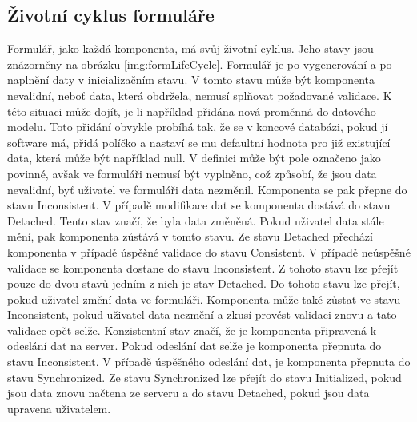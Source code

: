 \subsection{Životní cyklus formuláře}
Formulář, jako každá komponenta, má svůj životní cyklus. Jeho stavy jsou znázorněny na obrázku \ref{img:formLifeCycle}. Formulář je po vygenerování a po naplnění daty v inicializačním stavu. V tomto stavu může být komponenta nevalidní, neboť data, která obdržela, nemusí splňovat požadované validace. K této situaci může dojít, je-li například přidána nová proměnná do datového modelu. Toto přidání obvykle probíhá tak, že se v koncové databázi, pokud jí software má, přidá políčko a nastaví se mu defaultní hodnota pro již existující data, která může být například null. V definici může být pole označeno jako povinné, avšak ve formuláři nemusí být vyplněno, což způsobí, že jsou data nevalidní, byť uživatel ve formuláři data nezměnil. Komponenta se pak přepne do stavu Inconsistent. V případě modifikace dat se komponenta dostává do stavu Detached. Tento stav značí, že byla data změněná. Pokud uživatel data stále mění, pak komponenta zůstává v tomto stavu. Ze stavu Detached přechází komponenta v případě úspěšné validace do stavu Consistent. V případě neúspěšné validace se komponenta dostane do stavu Inconsistent. Z tohoto stavu lze přejít pouze do dvou stavů jedním z nich je stav Detached. Do tohoto stavu lze přejít, pokud uživatel změní data ve formuláři. Komponenta může také zůstat ve stavu Inconsistent, pokud uživatel data nezmění a zkusí provést validaci znovu a tato validace opět selže. Konzistentní stav značí, že je komponenta připravená k odeslání dat na server. Pokud odeslání dat selže je komponenta přepnuta do stavu Inconsistent. V případě úspěšného odeslání dat, je komponenta přepnuta do stavu Synchronized. Ze stavu Synchronized lze přejít do stavu Initialized, pokud jsou data znovu načtena ze serveru a do stavu Detached, pokud jsou data upravena uživatelem.

